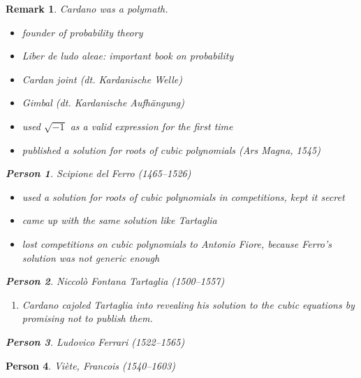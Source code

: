 \documentclass[a4paper]{article}
\numberwithin{lecref}{section}
\newtheorem*{Remark}{Remark}
\newtheorem*{Person}{Person}
\begin{document}
\begin{Remark}
  Cardano was a polymath.
  \begin{itemize}
    \item founder of probability theory
    \item \emph{Liber de ludo aleae}: important book on probability
    \item Cardan joint (dt. \foreignlanguage{german}{Kardanische Welle})
    \item Gimbal (dt. \foreignlanguage{german}{Kardanische Aufh\"angung})
    \item used $\sqrt{-1}$ as a valid expression for the first time
    \item published a solution for roots of cubic polynomials (Ars Magna, 1545)
  \end{itemize}

  \begin{Person}
    Scipione del Ferro (1465--1526)
  \end{Person}

  \begin{itemize}
    \item used a solution for roots of cubic polynomials in competitions, kept it secret
    \item came up with the same solution like Tartaglia
    \item lost competitions on cubic polynomials to Antonio Fiore, because Ferro's solution was not generic enough
  \end{itemize}

  \begin{Person}
    Niccol\`o Fontana Tartaglia (1500--1557)
  \end{Person}

  \begin{enumerate}
    \item Cardano cajoled Tartaglia into revealing his solution to the cubic equations by promising not to publish them.
  \end{enumerate}

  \begin{Person}
    Ludovico Ferrari (1522--1565)
  \end{Person}
\end{Remark}

\begin{Person}
  Vi\`ete, Francois (1540--1603)
\end{Person}
\end{document}
